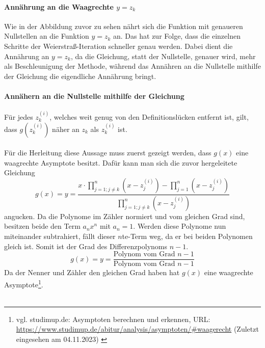 \documentclass[12pt]{article}
\begin{document}
\paragraph{Annährung an die Waagrechte $y=z_k$}
Wie in der Abbildung zuvor zu sehen nährt sich die Funktion mit genaueren Nullstellen an die Funktion $y=z_k$ an. Das hat zur Folge, dass die einzelnen Schritte der Weierstraß-Iteration schneller genau werden. Dabei dient die Annährung an $y=z_k$, da die Gleichung, statt der Nullstelle, genauer wird, mehr als Beschleunigung der Methode, während das Annähren an die Nullstelle mithilfe der Gleichung die eigendliche Annährung bringt.

\paragraph{Annähern an die Nullstelle mithilfe der Gleichung}
Für jedes $z_k^{(i)}$, welches weit genug von den Definitionslücken entfernt ist, gilt, dass $g(z_k^{(i)})$ näher an $z_k$ als $z_k^{(i)}$ ist.\\\\
Für die Herleitung diese Aussage muss zuerst gezeigt werden, dass $g(x)$ eine waagrechte Asymptote besitzt. Dafür kann man sich die zuvor hergeleitete Gleichung
\begin{equation*}
    g(x) = y = \frac{x \cdot \prod_{j=1;j\neq k}^{n} (x-z_j^{(i)}) - \prod_{j=1}^{n} (x-z_j^{(i)})}{\prod_{j=1;j\neq k}^{n} (x-z_j^{(i)})}
\end{equation*}
angucken. Da die Polynome im Zähler normiert und vom gleichen Grad sind, besitzen beide den Term $a_nx^n$ mit $a_n = 1$. Werden diese Polynome nun miteinander subtrahiert, fällt dieser $n$te-Term weg, da er bei beiden Polynomen gleich ist. Somit ist der Grad des Differenzpolynoms $n-1$. \\
\begin{equation*}
    g(x) = y = \frac{\text{Polynom vom Grad }n-1}{\text{Polynom vom Grad }n-1}
\end{equation*}
Da der Nenner und Zähler den gleichen Grad haben hat $g(x)$ eine waagrechte Asymptote\footnote{
    vgl. studimup.de: Asymptoten berechnen und erkennen, URL: \url{https://www.studimup.de/abitur/analysis/asymptoten/#waagerecht} (Zuletzt eingesehen am 04.11.2023) \label{ftn:studimup.de}
}.\\\\
\end{document}
